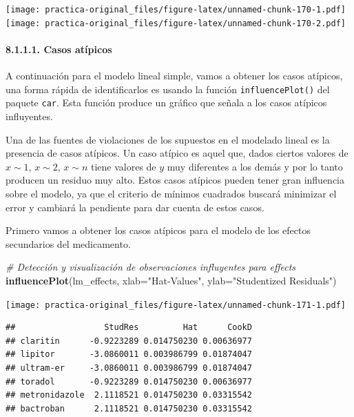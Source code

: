 \documentclass[spanish,]{article}
\newenvironment{Shaded}{\begin{snugshade}}{\end{snugshade}}
\newcommand{\KeywordTok}[1]{\textcolor[rgb]{0.13,0.29,0.53}{\textbf{#1}}}
\newcommand{\DataTypeTok}[1]{\textcolor[rgb]{0.13,0.29,0.53}{#1}}
\newcommand{\StringTok}[1]{\textcolor[rgb]{0.31,0.60,0.02}{#1}}
\newcommand{\CommentTok}[1]{\textcolor[rgb]{0.56,0.35,0.01}{\textit{#1}}}
\newcommand{\NormalTok}[1]{#1}
\let\oldparagraph\paragraph
\renewcommand{\paragraph}[1]{\oldparagraph{#1}\mbox{}}
\begin{document}
\texttt{[image: practica-original\_files/figure-latex/unnamed-chunk-170-1.pdf]}
\texttt{[image: practica-original\_files/figure-latex/unnamed-chunk-170-2.pdf]}

\paragraph{8.1.1.1. Casos atípicos}\label{casos-atipicos}

A continuación para el modelo lineal simple, vamos a obtener los casos
atípicos, una forma rápida de identificarlos es usando la función
\texttt{influencePlot()} del paquete \texttt{car}. Esta función produce
un gráfico que señala a los casos atípicos influyentes.

Una de las fuentes de violaciones de los supuestos en el modelado lineal
es la presencia de casos atípicos. Un caso atípico es aquel que, dados
ciertos valores de \(x \sim 1\), \(x \sim 2\), \(x \sim n\) tiene
valores de \(y\) muy diferentes a los demás y por lo tanto producen un
residuo muy alto. Estos casos atípicos pueden tener gran influencia
sobre el modelo, ya que el criterio de mínimos cuadrados buscará
minimizar el error y cambiará la pendiente para dar cuenta de estos
casos.

Primero vamos a obtener los casos atípicos para el modelo de los efectos
secundarios del medicamento.

\begin{Shaded}
\begin{Highlighting}[]
\CommentTok{# Detección y visualización de observaciones influyentes para effects}
\KeywordTok{influencePlot}\NormalTok{(lm_effects, }\DataTypeTok{xlab=}\StringTok{"Hat-Values"}\NormalTok{, }\DataTypeTok{ylab=}\StringTok{"Studentized Residuals"}\NormalTok{)}
\end{Highlighting}
\end{Shaded}

\texttt{[image: practica-original\_files/figure-latex/unnamed-chunk-171-1.pdf]}

\begin{verbatim}
##                  StudRes         Hat      CookD
## claritin      -0.9223289 0.014750230 0.00636977
## lipitor       -3.0860011 0.003986799 0.01874047
## ultram-er     -3.0860011 0.003986799 0.01874047
## toradol       -0.9223289 0.014750230 0.00636977
## metronidazole  2.1118521 0.014750230 0.03315542
## bactroban      2.1118521 0.014750230 0.03315542
\end{verbatim}
\end{document}
